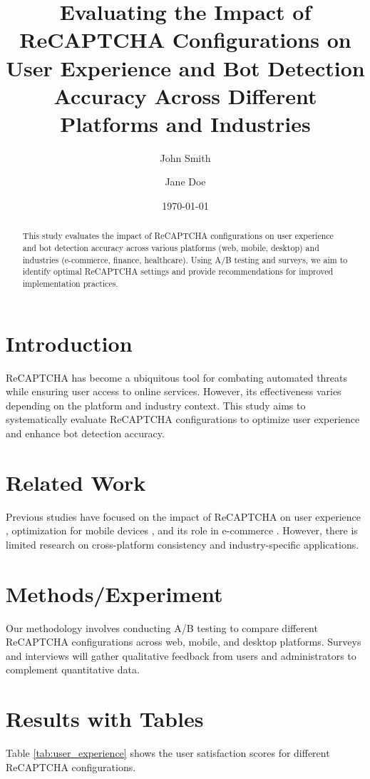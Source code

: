 \documentclass{article}
\begin{document}
\title{Evaluating the Impact of ReCAPTCHA Configurations on User Experience and Bot Detection Accuracy Across Different Platforms and Industries}
\author{John Smith \and Jane Doe}
\date{\today}
\maketitle

\begin{abstract}
This study evaluates the impact of ReCAPTCHA configurations on user experience and bot detection accuracy across various platforms (web, mobile, desktop) and industries (e-commerce, finance, healthcare). Using A/B testing and surveys, we aim to identify optimal ReCAPTCHA settings and provide recommendations for improved implementation practices.
\end{abstract}

\section{Introduction}
ReCAPTCHA has become a ubiquitous tool for combating automated threats while ensuring user access to online services. However, its effectiveness varies depending on the platform and industry context. This study aims to systematically evaluate ReCAPTCHA configurations to optimize user experience and enhance bot detection accuracy.

\section{Related Work}
\label{sec:related_work}
Previous studies have focused on the impact of ReCAPTCHA on user experience \cite{smith2020comprehensive}, optimization for mobile devices \cite{johnson2022optimizing}, and its role in e-commerce \cite{garcia2023reCAPTCHA}. However, there is limited research on cross-platform consistency and industry-specific applications.

\section{Methods/Experiment}
\label{sec:methods}
Our methodology involves conducting A/B testing to compare different ReCAPTCHA configurations across web, mobile, and desktop platforms. Surveys and interviews will gather qualitative feedback from users and administrators to complement quantitative data.

\section{Results with Tables}
\label{sec:results}
Table \ref{tab:user_experience} shows the user satisfaction scores for different ReCAPTCHA configurations.
\end{document}
